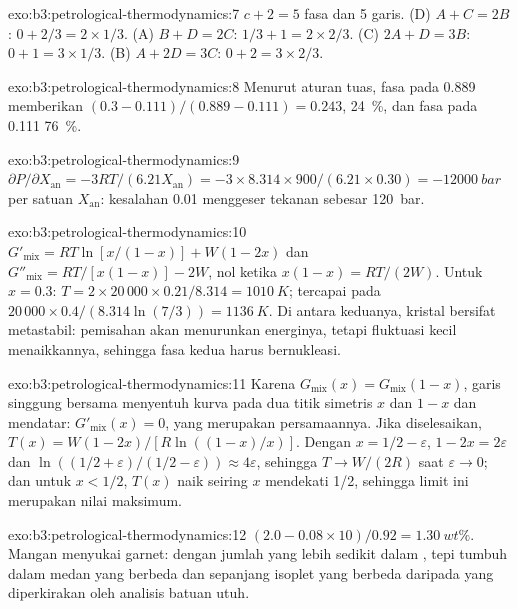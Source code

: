 \begin{solution}{exo:b3:petrological-thermodynamics:7}
$c + 2 = 5$ fasa dan 5 garis. (D) $A + C = 2B$: $0 + 2/3 = 2\times1/3$. (A)
$B + D = 2C$: $1/3 + 1 = 2\times2/3$. (C) $2A + D = 3B$: $0 + 1 = 3\times1/3$.
(B) $A + 2D = 3C$: $0 + 2 = 3\times2/3$.
\end{solution}

\begin{solution}{exo:b3:petrological-thermodynamics:8}
Menurut aturan tuas, fasa pada 0.889 memberikan $(0.3 - 0.111)/(0.889 - 0.111) =
0.243$, \qty{24}{\percent}, dan fasa pada 0.111 \qty{76}{\percent}.
\end{solution}

\begin{solution}{exo:b3:petrological-thermodynamics:9}
$\partial P/\partial X_{\text{an}} = -3RT/(6.21X_{\text{an}}) =
-3\times8.314\times900/(6.21\times0.30) = \qty{-12000}{bar}$ per satuan
$X_{\text{an}}$: kesalahan 0.01 menggeser tekanan sebesar \qty{120}{bar}.
\end{solution}

\begin{solution}{exo:b3:petrological-thermodynamics:10}
$G'_{\text{mix}} = RT\ln[x/(1 - x)] + W(1 - 2x)$ dan $G''_{\text{mix}} =
RT/[x(1 - x)] - 2W$, nol ketika $x(1 - x) = RT/(2W)$. Untuk $x = 0.3$: $T =
2\times20\,000\times0.21/8.314 = \qty{1010}{K}$;  tercapai pada
$20\,000\times0.4/(8.314\ln(7/3)) = \qty{1136}{K}$. Di antara keduanya, kristal
bersifat metastabil: pemisahan akan menurunkan energinya, tetapi fluktuasi kecil
menaikkannya, sehingga fasa kedua harus bernukleasi.
\end{solution}

\begin{solution}{exo:b3:petrological-thermodynamics:11}
Karena $G_{\text{mix}}(x) = G_{\text{mix}}(1 - x)$, garis singgung bersama menyentuh
kurva pada dua titik simetris $x$ dan $1 - x$ dan mendatar:
$G'_{\text{mix}}(x) = 0$, yang merupakan persamaannya. Jika diselesaikan, $T(x) = W(1 -
2x)/[R\ln((1 - x)/x)]$. Dengan $x = 1/2 - \varepsilon$, $1 - 2x = 2\varepsilon$
dan $\ln((1/2 + \varepsilon)/(1/2 - \varepsilon)) \approx 4\varepsilon$, sehingga
$T \to W/(2R)$ saat $\varepsilon \to 0$; dan untuk $x < 1/2$, $T(x)$ naik seiring $x$
mendekati 1/2, sehingga limit ini merupakan nilai maksimum.
\end{solution}

\begin{solution}{exo:b3:petrological-thermodynamics:12}
$(2.0 - 0.08\times10)/0.92 = \qty{1.30}{wt\percent}$. Mangan menyukai
garnet: dengan jumlah yang lebih sedikit dalam , tepi tumbuh dalam
medan yang berbeda dan sepanjang isoplet yang berbeda daripada
yang diperkirakan oleh analisis batuan utuh.
\end{solution}

